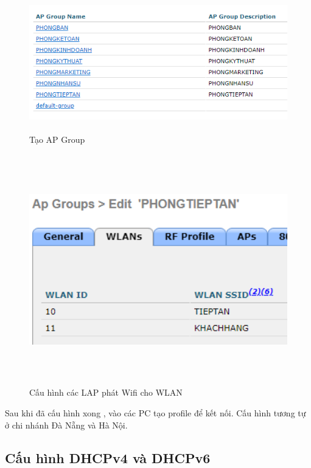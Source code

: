 \documentclass[12pt,a4paper]{report}
\begin{document}
\begin{figure}[H]
    \centering
    \includegraphics[width=16cm, height=6cm]{img/APGroup.png}
    \caption{Tạo AP Group}
    \label{hinh46f}
\end{figure}
\begin{figure}[H]
    \centering
    \includegraphics[width=16cm, height=10cm]{img/phongtieptan.png}
    \caption{Cấu hình các LAP phát Wifi cho WLAN}
    \label{hinh46h}
\end{figure}
\hspace*{0.25cm} Sau khi đã cấu hình xong , vào các PC tạo profile để kết nối.
\hspace*{0.25cm}Cấu hình tương tự ở chi nhánh Đà Nẵng và Hà Nội.

\subsection{Cấu hình DHCPv4 và DHCPv6}
\end{document}

